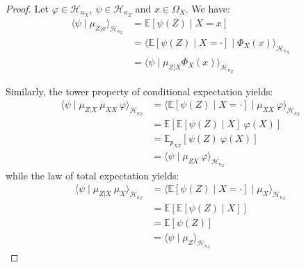 \begin{proof}
	Let $\varphi\in\mathcal{H}_{\kappa_X}$, $\psi\in\mathcal{H}_{\kappa_Z}$ and $x\in\Omega_X$. We have:
	\begin{equation}
		\begin{aligned}
		\langle\psi\mid\mu_{Z|x}\rangle_{\mathcal{H}_{\kappa_Z}}&=\mathbb{E}[\psi(Z)\mid X=x]\\
		&=\langle\mathbb{E}[\psi(Z)\mid X=\cdot]\mid\Phi_X(x)\rangle_{\mathcal{H}_{\kappa_X}}\\
		&=\langle\psi\mid\mu_{Z|X}\Phi_X(x)\rangle_{\mathcal{H}_{\kappa_Z}}
		\end{aligned}
	\end{equation}

	Similarly, the tower property of conditional expectation yields:
	\begin{equation}
		\begin{aligned}
		\langle\psi\mid\mu_{Z|X}\:\mu_{XX}\:\varphi\rangle_{\mathcal{H}_{\kappa_Z}}&=\langle\mathbb{E}[\psi(Z)\mid X=\cdot]\mid\mu_{XX}\:\varphi\rangle_{\mathcal{H}_{\kappa_X}}\\
		&=\mathbb{E}\left[\mathbb{E}[\psi(Z)\mid X]\:\varphi(X)\right]\\
		&=\mathbb{E}_{p_{XZ}}\left[\psi(Z)\:\varphi(X)\right]\\
		&=\langle\psi\mid\mu_{ZX}\:\varphi\rangle_{\mathcal{H}_{\kappa_Z}}
		\end{aligned}
	\end{equation}
	while the law of total expectation yields:
	\begin{equation}
		\begin{aligned}
		\langle\psi\mid\mu_{Z|X}\:\mu_X\rangle_{\mathcal{H}_{\kappa_Z}}&=\langle\mathbb{E}[\psi(Z)\mid X=\cdot]\mid\mu_X\rangle_{\mathcal{H}_{\kappa_X}}\\
		&=\mathbb{E}\left[\mathbb{E}[\psi(Z)\mid X]\right]\\
		&=\mathbb{E}\left[\psi(Z)\right]\\
		&=\langle\psi\mid\mu_Z\rangle_{\mathcal{H}_{\kappa_Z}}
		\end{aligned}
	\end{equation}
\end{proof}
